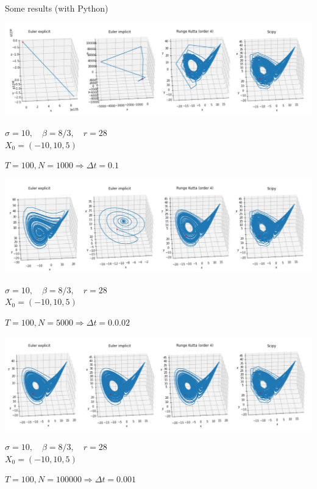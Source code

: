 \documentclass[10pt,xcolor={table,dvipsnames},t]{beamer}
\begin{document}
\begin{frame}[allowframebreaks]{Some results (with Python)}

    \includegraphics[width=\textwidth]{images/N1000.png} \\ 
    \begin{center}
    	\begin{minipage}[c]{0.5\linewidth}
    		$\sigma=10,\quad \beta=8/3, \quad r=28$ \\
    		$X_0=(-10,10,5)$ 
    	\end{minipage}
    	$T=100, N = 1000 \Rightarrow \Delta t=0.1$
    \end{center}

	\newpage
	
	\includegraphics[width=\textwidth]{images/N5000.png} \\ 
	\begin{center}
		\begin{minipage}[c]{0.5\linewidth}
			$\sigma=10,\quad \beta=8/3, \quad r=28$ \\
			$X_0=(-10,10,5)$ 
		\end{minipage}
		$T=100, N = 5000 \Rightarrow \Delta t=0.0.02$
	\end{center}

	\newpage
	
	\includegraphics[width=\textwidth]{images/N100000.png} \\ 
	\begin{center}
		\begin{minipage}[c]{0.5\linewidth}
			$\sigma=10,\quad \beta=8/3, \quad r=28$ \\
			$X_0=(-10,10,5)$ 
		\end{minipage}
		$T=100, N = 100000 \Rightarrow \Delta t=0.001$
	\end{center}


\end{frame}
\end{document}
